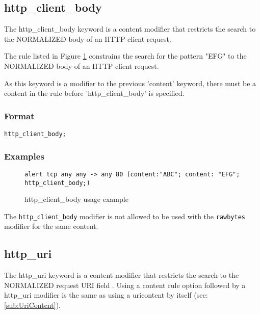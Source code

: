 \documentclass[english]{report}
\newenvironment{note}{
\samepage
    \vspace{10pt}{\textsf{
        {\hspace{7pt}\Huge{$\triangle$\hspace{-12.5pt}{\Large{$^!$}}}}\hspace{5pt}
        {\Large{NOTE}}
    }
    }
   \begin{center}
    \par\vspace{-17pt}

    \begin{lrbox}{\savepar}
    \begin{minipage}[r]{6in}
}
{
    \end{minipage}
    \end{lrbox}
    \fbox{
        \usebox{
            \savepar
	}
    }
    \par\vskip10pt
    \end{center}
}
\begin{document}
\subsection{http\_client\_body\label{sub:HttpClientBody}}

The http\_client\_body keyword is a content modifier that restricts
the search to the NORMALIZED body of an HTTP client request.

The rule listed in Figure \ref{fig:HttpClientBody} constrains the
search for the pattern "EFG" to the NORMALIZED body of an HTTP client request.

As this keyword is a modifier to the previous 'content' keyword, there must be
a content in the rule before 'http\_client\_body' is specified.

\subsubsection{Format}

\begin{verbatim}
http_client_body;
\end{verbatim}

\subsubsection{Examples}

\begin{figure}[!hbpt]
\begin{verbatim}
alert tcp any any -> any 80 (content:"ABC"; content: "EFG"; http_client_body;)
\end{verbatim}
\caption{http\_client\_body usage example \label{fig:HttpClientBody}}
\end{figure}

\begin{note}
The \texttt{http\_client\_body} modifier is not allowed to be used with
the \texttt{rawbytes} modifier for the same content.
\end{note}


\subsection{http\_uri\label{sub:HttpUri}}

The http\_uri keyword is a content modifier that restricts
the search to the NORMALIZED request \textsc{URI} field .  Using a
content rule option followed by a http\_uri modifier is the
same as using a uricontent by itself (see: \ref{sub:UriContent}).
\end{document}
